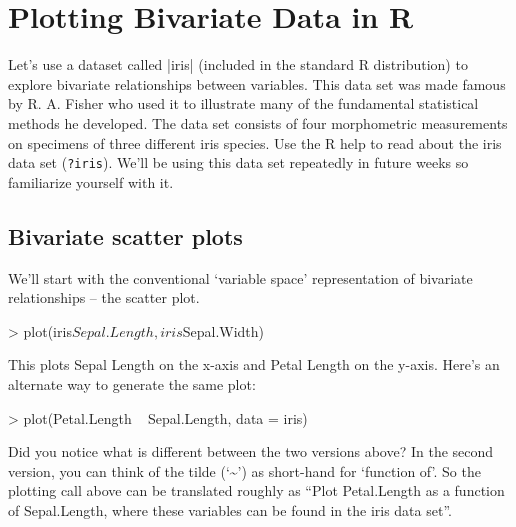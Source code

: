 \section{Plotting Bivariate Data in R}


Let's use a dataset called |iris| (included in the standard R distribution) to explore bivariate relationships between variables. This data set was made famous by R. A. Fisher who used it to illustrate many of the fundamental statistical methods he developed. The data set consists of four morphometric measurements on specimens of three different iris species. Use the R help to read about the iris data set (\lstinline!?iris!). We'll be using this data set repeatedly in future weeks so familiarize yourself with it.
%


\subsection{Bivariate scatter plots}
We'll start with the conventional `variable space' representation of bivariate relationships -- the scatter plot.
%
\begin{R}
> plot(iris$Sepal.Length, iris$Sepal.Width)
\end{R}
%
This plots Sepal Length on the x-axis and Petal Length on the y-axis. Here's an alternate way to generate the same plot:
%
\begin{R}
> plot(Petal.Length ~ Sepal.Length, data = iris)
\end{R}
%
Did you notice what is different between the two versions above?  In the second version, you can think of the tilde (`\textasciitilde') as short-hand for `function of'.  So the plotting call above can be translated roughly as ``Plot Petal.Length as a function of Sepal.Length, where these variables can be found in the iris data set''.

